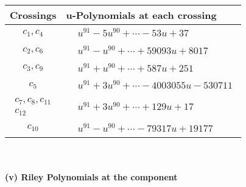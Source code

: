 \documentclass[1p]{elsarticle_modified}
\theoremstyle{definition}
\begin{document}
\begin{tabular}{m{50pt}|m{274pt}}
Crossings & \hspace{64pt}u-Polynomials at each crossing \\
\hline $$\begin{aligned}c_{1},c_{4}\end{aligned}$$&$\begin{aligned}
&u^{91}-5 u^{90}+\cdots-53 u+37
\end{aligned}$\\
\hline $$\begin{aligned}c_{2},c_{6}\end{aligned}$$&$\begin{aligned}
&u^{91}- u^{90}+\cdots+59093 u+8017
\end{aligned}$\\
\hline $$\begin{aligned}c_{3},c_{9}\end{aligned}$$&$\begin{aligned}
&u^{91}+u^{90}+\cdots+587 u+251
\end{aligned}$\\
\hline $$\begin{aligned}c_{5}\end{aligned}$$&$\begin{aligned}
&u^{91}+3 u^{90}+\cdots-4003055 u-530711
\end{aligned}$\\
\hline $$\begin{aligned}c_{7},c_{8},c_{11}\\c_{12}\end{aligned}$$&$\begin{aligned}
&u^{91}+3 u^{90}+\cdots+129 u+17
\end{aligned}$\\
\hline $$\begin{aligned}c_{10}\end{aligned}$$&$\begin{aligned}
&u^{91}- u^{90}+\cdots-79317 u+19177
\end{aligned}$\\
\hline
\end{tabular}\\~\\
\newpage\renewcommand{\arraystretch}{1}
\flushleft \textbf{(v) Riley Polynomials at the component}\newline \\
\end{document}
